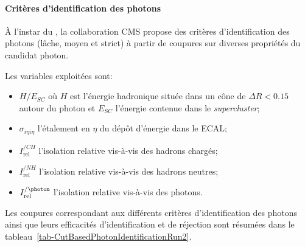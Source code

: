 \paragraph{Critères d'identification des photons}
À l'instar du \CutBasedEleID,
la collaboration CMS propose des critères d'identification des photons (lâche, moyen et strict) à partir de coupures sur diverses propriétés du \og candidat \fg{} photon.
\par
Les variables exploitées sont:
\begin{itemize}
\item $H/E_{SC}$ où $H$ est l'énergie hadronique située dans un cône de $\Delta R < \num{0.15}$ autour du photon et $E_{SC}$ l'énergie contenue dans le \emph{supercluster};
\item $\sigma_{i\eta i\eta}$ l'étalement en $\eta$ du dépôt d'énergie dans le ECAL;
\item $I^{/CH}_\text{rel}$ l'isolation relative vis-à-vis des hadrons chargés;
\item $I^{/NH}_\text{rel}$ l'isolation relative vis-à-vis des hadrons neutres;
\item $I^{/\photon}_\text{rel}$ l'isolation relative vis-à-vis des photons.
\end{itemize}
Les coupures correspondant aux différents critères d'identification des photons ainsi que leurs efficacités d'identification et de réjection sont résumées dans le tableau~\ref{tab-CutBasedPhotonIdentificationRun2}.
